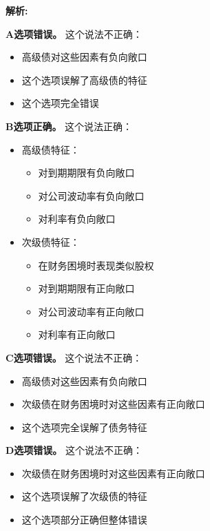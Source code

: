 \documentclass{article}
\newenvironment{explanation}
{\textbf{解析:}\par}
{\par}
\begin{document}
\begin{explanation}
    \textbf{A选项错误。}
    这个说法不正确：
    \begin{itemize}
        \item 高级债对这些因素有负向敞口
        \item 这个选项误解了高级债的特征
        \item 这个选项完全错误
    \end{itemize}

    \textbf{B选项正确。}
    这个说法正确：
    \begin{itemize}
        \item 高级债特征：
        \begin{itemize}
            \item 对到期期限有负向敞口
            \item 对公司波动率有负向敞口
            \item 对利率有负向敞口
        \end{itemize}
        \item 次级债特征：
        \begin{itemize}
            \item 在财务困境时表现类似股权
            \item 对到期期限有正向敞口
            \item 对公司波动率有正向敞口
            \item 对利率有正向敞口
        \end{itemize}
    \end{itemize}

    \textbf{C选项错误。}
    这个说法不正确：
    \begin{itemize}
        \item 高级债对这些因素有负向敞口
        \item 次级债在财务困境时对这些因素有正向敞口
        \item 这个选项完全误解了债务特征
    \end{itemize}

    \textbf{D选项错误。}
    这个说法不正确：
    \begin{itemize}
        \item 次级债在财务困境时对这些因素有正向敞口
        \item 这个选项误解了次级债的特征
        \item 这个选项部分正确但整体错误
    \end{itemize}
\end{explanation}
\end{document}
